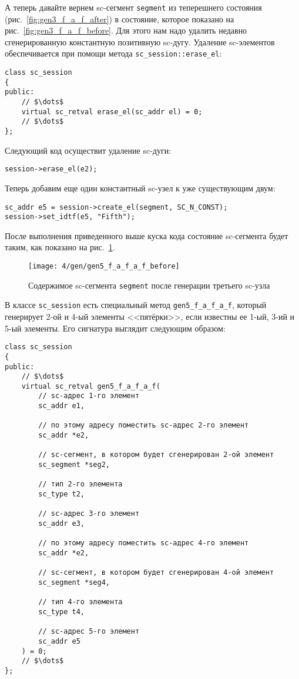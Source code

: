 А теперь давайте вернем sc-сегмент \lstinline|segment| из теперешнего
состояния (рис.~\ref{fig:gen3_f_a_f_after}) в состояние, которое
показано на рис.~\ref{fig:gen3_f_a_f_before}. Для этого нам надо
удалить недавно сгенерированную константную позитивную
sc-дугу. Удаление sc-элементов обеспечивается при помощи метода
\lstinline|sc_session::erase_el|:

\begin{lstlisting}[texcl]
class sc_session
{
public:
    // $\dots$
    virtual sc_retval erase_el(sc_addr el) = 0;
    // $\dots$
};
\end{lstlisting}

Следующий код осуществит удаление sc-дуги:

\begin{lstlisting}[texcl]
session->erase_el(e2);
\end{lstlisting}

Теперь добавим еще один константный sc-узел к уже существующим двум:

\begin{lstlisting}[texcl]
sc_addr e5 = session->create_el(segment, SC_N_CONST);
session->set_idtf(e5, "Fifth");
\end{lstlisting}

После выполнения приведенного выше куска кода состояние sc-сегмента
будет таким, как показано на рис.~\ref{fig:gen5_f_a_f_a_f_before}.

\begin{figure}[h!]
  \centering
  \texttt{[image: 4/gen/gen5\_f\_a\_f\_a\_f\_before]}
  \caption{Содержимое sc-сегмента \lstinline|segment| после генерации
    третьего sc-узла}
  \label{fig:gen5_f_a_f_a_f_before}
\end{figure}

В классе \lstinline|sc_session| есть специальный метод
\lstinline|gen5_f_a_f_a_f|, который генерирует 2-ой и 4-ый элементы
<<пятёрки>>, если известны ее 1-ый, 3-ий и 5-ый элементы. Его
сигнатура выглядит следующим образом:

\begin{lstlisting}[texcl]
class sc_session
{
public:
    // $\dots$
    virtual sc_retval gen5_f_a_f_a_f(
        // sc-адрес 1-го элемент
        sc_addr e1,

        // по этому адресу поместить sc-адрес 2-го элемент
        sc_addr *e2,

        // sc-сегмент, в котором будет сгенерирован 2-ой элемент
        sc_segment *seg2, 

        // тип 2-го элемента
        sc_type t2,

        // sc-адрес 3-го элемент
        sc_addr e3,

        // по этому адресу поместить sc-адрес 4-го элемент
        sc_addr *e2,

        // sc-сегмент, в котором будет сгенерирован 4-ой элемент
        sc_segment *seg4,

        // тип 4-го элемента
        sc_type t4,

        // sc-адрес 5-го элемент
        sc_addr e5
    ) = 0;
    // $\dots$
};
\end{lstlisting}

